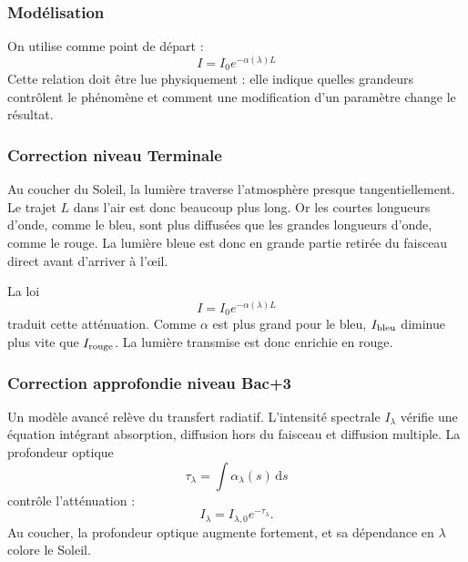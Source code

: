 \documentclass[11pt,a4paper]{article}
\begin{document}
\subsubsection*{Modélisation}

\begin{theorembox}
On utilise comme point de départ :
\[
I=I_0e^{-\alpha(\lambda)L}
\]
Cette relation doit être lue physiquement : elle indique quelles grandeurs contrôlent le phénomène et comment une modification d'un paramètre change le résultat.
\end{theorembox}

\subsubsection*{Correction niveau Terminale}

\begin{corrigebox}

Au coucher du Soleil, la lumière traverse l'atmosphère presque tangentiellement. Le trajet \(L\) dans l'air est donc beaucoup plus long. Or les courtes longueurs d'onde, comme le bleu, sont plus diffusées que les grandes longueurs d'onde, comme le rouge. La lumière bleue est donc en grande partie retirée du faisceau direct avant d'arriver à l'œil.

La loi
\[
I=I_0e^{-\alpha(\lambda)L}
\]
traduit cette atténuation. Comme \(\alpha\) est plus grand pour le bleu, \(I_{\rm bleu}\) diminue plus vite que \(I_{\rm rouge}\). La lumière transmise est donc enrichie en rouge.

\end{corrigebox}

\subsubsection*{Correction approfondie niveau Bac+3}

\begin{approfondissementbox}

Un modèle avancé relève du transfert radiatif. L'intensité spectrale \(I_\lambda\) vérifie une équation intégrant absorption, diffusion hors du faisceau et diffusion multiple. La profondeur optique
\[
\tau_\lambda=\int \alpha_\lambda(s)\,\mathrm ds
\]
contrôle l'atténuation :
\[
I_\lambda=I_{\lambda,0}e^{-\tau_\lambda}.
\]
Au coucher, la profondeur optique augmente fortement, et sa dépendance en \(\lambda\) colore le Soleil.

\end{approfondissementbox}
\end{document}
